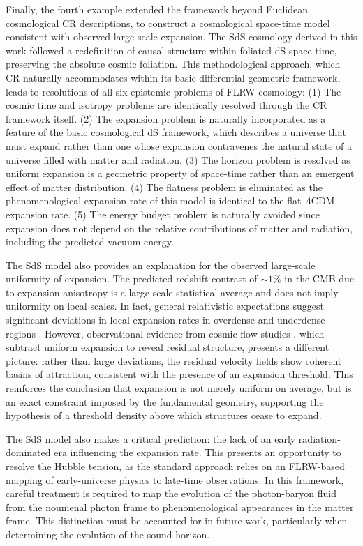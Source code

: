 \documentclass[aps,prd,reprint,superscriptaddress]{revtex4-2}
\begin{document}
Finally, the fourth example extended the framework beyond Euclidean cosmological CR descriptions, to construct a cosmological space-time model consistent with observed large-scale expansion. The SdS cosmology derived in this work followed a redefinition of causal structure within foliated dS space-time, preserving the absolute cosmic foliation. This methodological approach, which CR naturally accommodates within its basic differential geometric framework, leads to resolutions of all six epistemic problems of FLRW cosmology: (1) The cosmic time and isotropy problems are identically resolved through the CR framework itself. (2) The expansion problem is naturally incorporated as a feature of the basic cosmological dS framework, which describes a universe that must expand rather than one whose expansion contravenes the natural state of a universe filled with matter and radiation. (3) The horizon problem is resolved as uniform expansion is a geometric property of space-time rather than an emergent effect of matter distribution. (4) The flatness problem is eliminated as the phenomenological expansion rate of this model is identical to the flat $\Lambda$CDM expansion rate. (5) The energy budget problem is naturally avoided since expansion does not depend on the relative contributions of matter and radiation, including the predicted vacuum energy. 

The SdS model also provides an explanation for the observed large-scale uniformity of expansion. The predicted redshift contrast of $\sim1\%$ in the CMB due to expansion anisotropy is a large-scale statistical average and does not imply uniformity on local scales. In fact, general relativistic expectations suggest significant deviations in local expansion rates in overdense and underdense regions \cite{Wiltshire2009,Seifert2025}. However, observational evidence from cosmic flow studies \cite{Tully2014,Valade2024}, which subtract uniform expansion to reveal residual structure, presents a different picture: rather than large deviations, the residual velocity fields show coherent basins of attraction, consistent with the presence of an expansion threshold. This reinforces the conclusion that expansion is not merely uniform on average, but is an exact constraint imposed by the fundamental geometry, supporting the hypothesis of a threshold density above which structures cease to expand.

The SdS model also makes a critical prediction: the lack of an early radiation-dominated era influencing the expansion rate. This presents an opportunity to resolve the Hubble tension, as the standard approach relies on an FLRW-based mapping of early-universe physics to late-time observations. In this framework, careful treatment is required to map the evolution of the photon-baryon fluid from the noumenal photon frame to phenomenological appearances in the matter frame. This distinction must be accounted for in future work, particularly when determining the evolution of the sound horizon.
\end{document}
